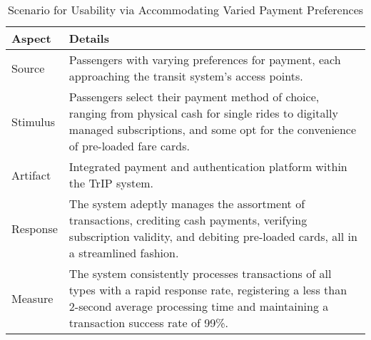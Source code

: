 \begin{table}[H]
    \centering
    \begin{tabularx}{\textwidth}{@{} lX @{}}
    \toprule
    \textbf{Aspect} & \textbf{Details} \\
    \midrule
    Source & Passengers with varying preferences for payment, each approaching the transit system's access points. \\
    Stimulus & Passengers select their payment method of choice, ranging from physical cash for single rides to digitally managed subscriptions, and some opt for the convenience of pre-loaded fare cards. \\
    Artifact & Integrated payment and authentication platform within the TrIP system. \\
    Response & The system adeptly manages the assortment of transactions, crediting cash payments, verifying subscription validity, and debiting pre-loaded cards, all in a streamlined fashion. \\
    Measure & The system consistently processes transactions of all types with a rapid response rate, registering a less than 2-second average processing time and maintaining a transaction success rate of 99\%. \\
    \bottomrule
    \end{tabularx}
    \caption{Scenario for Usability via Accommodating Varied Payment Preferences}
    \label{table:varied_payment_preferences}
\end{table}
